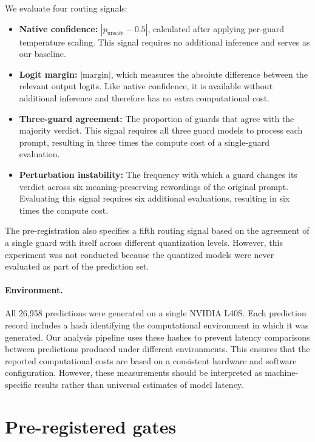 \documentclass[11pt]{article}
\begin{document}
We evaluate four routing signals:
\begin{itemize}
  \item \textbf{Native confidence:} $|p_{\text{unsafe}} - 0.5|$, calculated after applying per-guard temperature scaling. This signal requires no additional inference and serves as our baseline.
  \item \textbf{Logit margin:} $|\text{margin}|$, which measures the absolute difference between the relevant output logits. Like native confidence, it is available without additional inference and therefore has no extra computational cost.
  \item \textbf{Three-guard agreement:} The proportion of guards that agree with the majority verdict. This signal requires all three guard models to process each prompt, resulting in three times the compute cost of a single-guard evaluation.
  \item \textbf{Perturbation instability:} The frequency with which a guard changes its verdict across six meaning-preserving rewordings of the original prompt. Evaluating this signal requires six additional evaluations, resulting in six times the compute cost.
\end{itemize}

The pre-registration also specifies a fifth routing signal based on the agreement of a single guard with itself across different quantization levels. However, this experiment was not conducted because the quantized models were never evaluated as part of the prediction set.

\paragraph{Environment.} All 26,958 predictions were generated on a single NVIDIA L40S. Each prediction record includes a hash identifying the computational environment in which it was generated. Our analysis pipeline uses these hashes to prevent latency comparisons between predictions produced under different environments. This ensures that the reported computational costs are based on a consistent hardware and software configuration. However, these measurements should be interpreted as machine-specific results rather than universal estimates of model latency.

\section{Pre-registered gates}
\end{document}
